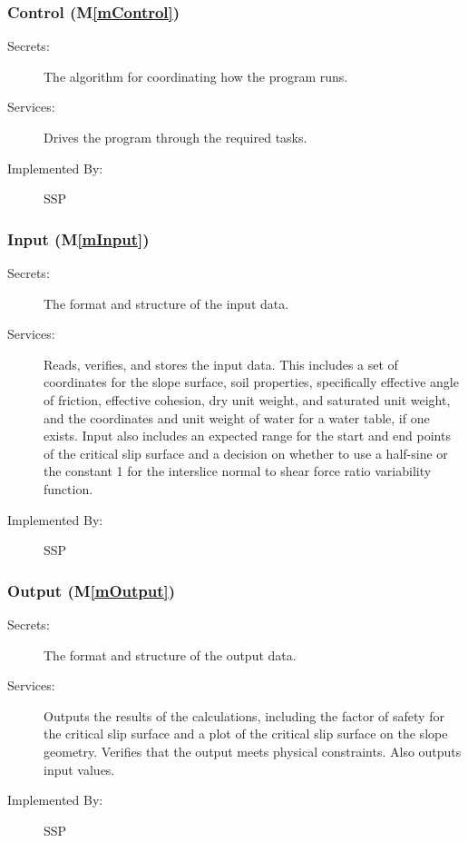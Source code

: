 \documentclass[12pt, titlepage]{article}
\newcommand{\progname}{SSP}
\newcommand{\mref}[1]{M\ref{#1}}
\begin{document}
\subsubsection{Control (\mref{mControl})}

\begin{description}
\item[Secrets:] The algorithm for coordinating how the program runs.
\item[Services:] Drives the program through the required tasks.
\item[Implemented By:] \progname
\end{description}


\subsubsection{Input (\mref{mInput})}

\begin{description}
\item[Secrets:]The format and structure of the input data.
\item[Services:] Reads, verifies, and stores the input data. This includes a 
  set of coordinates for the slope surface, soil properties, 
  specifically effective angle of friction, effective cohesion, dry unit 
  weight, and saturated unit weight, and the coordinates and unit weight of 
  water for a water table, if one exists. Input also includes an expected range 
  for the start and end points of the critical slip surface and a decision on 
  whether to use a half-sine or the constant 1 for the interslice normal to 
  shear force ratio variability function.
\item[Implemented By:] \progname
\end{description}

\subsubsection{Output (\mref{mOutput})}

\begin{description}
\item[Secrets:] The format and structure of the output data.
\item[Services:] Outputs the results of the calculations, including
  the factor of safety for the critical slip surface and a plot of the critical
  slip surface on the slope geometry. Verifies that the output meets physical 
  constraints. Also outputs input values.
\item[Implemented By:] \progname
\end{description} 
\end{document}

